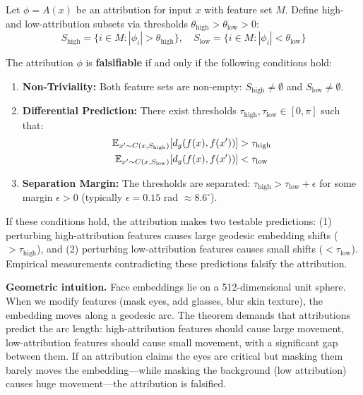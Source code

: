 \begin{theorem}
\label{thm:falsifiability}
Let $\phi = A(x)$ be an attribution for input $x$ with feature set $M$. Define high- and low-attribution subsets via thresholds $\theta_{\text{high}} > \theta_{\text{low}} > 0$:
\begin{equation}
S_{\text{high}} = \{i \in M : |\phi_i| > \theta_{\text{high}}\}, \quad
S_{\text{low}} = \{i \in M : |\phi_i| < \theta_{\text{low}}\}
\end{equation}

The attribution $\phi$ is \textbf{falsifiable} if and only if the following conditions hold:

\begin{enumerate}
\item \textbf{Non-Triviality:} Both feature sets are non-empty: $S_{\text{high}} \neq \emptyset$ and $S_{\text{low}} \neq \emptyset$.

\item \textbf{Differential Prediction:} There exist thresholds $\tau_{\text{high}}, \tau_{\text{low}} \in [0, \pi]$ such that:
\begin{align}
\mathbb{E}_{x' \sim C(x, S_{\text{high}})} [d_g(f(x), f(x'))] &> \tau_{\text{high}} \label{eq:pred-high}\\
\mathbb{E}_{x' \sim C(x, S_{\text{low}})} [d_g(f(x), f(x'))] &< \tau_{\text{low}} \label{eq:pred-low}
\end{align}

\item \textbf{Separation Margin:} The thresholds are separated: $\tau_{\text{high}} > \tau_{\text{low}} + \epsilon$ for some margin $\epsilon > 0$ (typically $\epsilon = 0.15$ rad $\approx 8.6^\circ$).
\end{enumerate}

If these conditions hold, the attribution makes two testable predictions: (1) perturbing high-attribution features causes large geodesic embedding shifts ($> \tau_{\text{high}}$), and (2) perturbing low-attribution features causes small shifts ($< \tau_{\text{low}}$). Empirical measurements contradicting these predictions falsify the attribution.
\end{theorem}

\textbf{Geometric intuition.} Face embeddings lie on a 512-dimensional unit sphere. When we modify features (mask eyes, add glasses, blur skin texture), the embedding moves along a geodesic arc. The theorem demands that attributions predict the arc length: high-attribution features should cause large movement, low-attribution features should cause small movement, with a significant gap between them. If an attribution claims the eyes are critical but masking them barely moves the embedding—while masking the background (low attribution) causes huge movement—the attribution is falsified.

